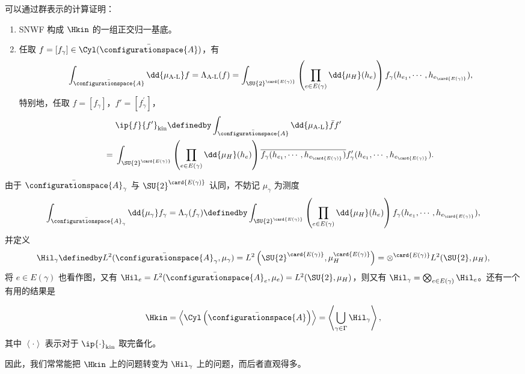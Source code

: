 			可以通过群表示的计算证明：
			\begin{Property}
				\begin{enumerate}
					\item SNWF 构成 $\Hkin$ 的一组正交归一基底。
					\item 任取 $f=[f_\gamma] \in \Cyl(\bar{\configurationspace{A}})$，有
					\begin{equation}
						\int_{\bar{\configurationspace{A}}} \dd{\mu_{\text{A-L}}} f = \Lambda_{\text{A-L}}(f) = \int_{\SU{2}^{\card{E(\gamma)}}} \left( \prod_{e\in E(\gamma)} \dd{\mu_H}(h_e) \right) f_\gamma(h_{e_1}, \cdots, h_{e_{\card{E(\gamma)}}}),
					\end{equation}
					特别地，任取 $f=[f_\gamma]$，$f'=[f^\prime_\gamma]$，
					\begin{equation}
						\begin{split}
							&\ip{f}{f'}_{\text{kin}} \definedby \int_{\bar{\configurationspace{A}}} \dd{\mu_{\text{A-L}}} \bar{f} f'\\
							={}& \int_{\SU{2}^{\card{E(\gamma)}}} \left( \prod_{e\in E(\gamma)} \dd{\mu_H}(h_e) \right) \overline{f_\gamma(h_{e_1}, \cdots, h_{e_{\card{E(\gamma)}}})}f^\prime_\gamma(h_{e_1}, \cdots, h_{e_{\card{E(\gamma)}}}).
						\end{split}
					\end{equation}
				\end{enumerate}
			\end{Property}
			由于 $\bar{\configurationspace{A}}_\gamma$ 与 $\SU{2}^{\card{E(\gamma)}}$ 认同，不妨记 $\mu_\gamma$ 为测度
			\begin{equation}
				\int_{\bar{\configurationspace{A}}_\gamma} \dd{\mu_\gamma} f_\gamma = \Lambda_\gamma(f_\gamma) \definedby \int_{\SU{2}^{\card{E(\gamma)}}} \left( \prod_{e\in E(\gamma)} \dd{\mu_H}(h_e) \right) f_\gamma(h_{e_1}, \cdots, h_{e_{\card{E(\gamma)}}}),
			\end{equation}
			并定义
			\begin{equation}
				\Hil_\gamma \definedby L^2(\bar{\configurationspace{A}}_\gamma,\mu_\gamma) = L^2 \left(\SU{2}^{\card{E(\gamma)}}, \mu_H^{\card{E(\gamma)}} \right) = \otimes^{\card{E(\gamma)}} L^2(\SU{2}, \mu_H),
			\end{equation}
			将 $e\in E(\gamma)$ 也看作图，又有 $\Hil_e = L^2(\bar{\configurationspace{A}}_e,\mu_e) = L^2(\SU{2}, \mu_H)$，则又有 $\Hil_\gamma = \bigotimes_{e\in E(\gamma)} \Hil_e$。还有一个有用的结果是
			\begin{Property}
				\begin{equation}
					\Hkin = \left\langle \Cyl\left( \bar{\configurationspace{A}} \right) \right\rangle = \left\langle \bigcup_{\gamma \in \Gamma} \Hil_\gamma \right\rangle,
				\end{equation}
				其中 $\left\langle \cdot \right\rangle$ 表示对于 $\ip{\cdot}_{\text{kin}}$ 取完备化。
			\end{Property}
			因此，我们常常能把 $\Hkin$ 上的问题转变为 $\Hil_\gamma$ 上的问题，而后者直观得多。

